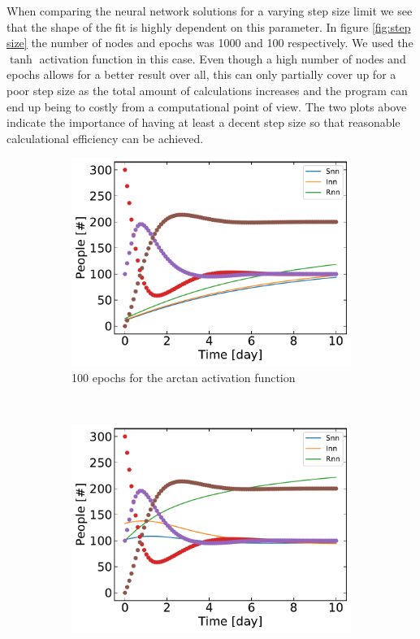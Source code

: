  	When comparing the neural network solutions for a varying step size limit we see that the shape of the fit is highly dependent on this parameter. In figure \ref{fig:step size} the number of nodes and epochs was 1000 and 100 respectively. We used the $\tanh$ activation function in this case. Even though a high number of nodes and epochs allows for a better result over all, this can only partially cover up for a poor step size as the total amount of calculations increases and the program can end up being to costly from a computational point of view. The two plots above indicate the importance of having at least a decent step size so that reasonable calculational efficiency can be achieved.

	 \begin{figure}[H]
	\centering
	\begin{subfigure}{0.5\textwidth}
		\centering
		\includegraphics[width=\linewidth]{result/Resultater_supervised/arctan_1000_100_0001.pdf}
		\caption{100 epochs for the arctan activation function}
	\end{subfigure}%
	~ 
	\begin{subfigure}{0.5\textwidth}
		\centering
		\includegraphics[width=\linewidth]{result/Resultater_supervised/arctan_1000_1000_0001.pdf}

\end{subfigure}
\end{figure}
